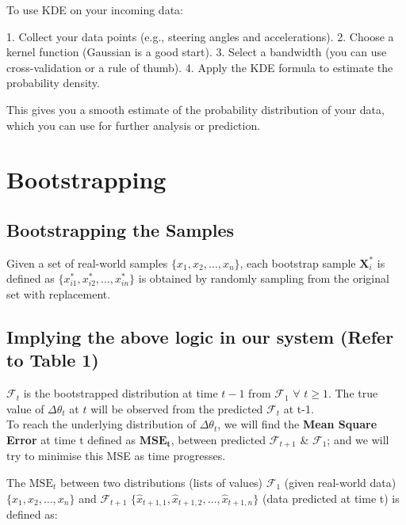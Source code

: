 \documentclass[conference]{IEEEtran}
\begin{document}
To use KDE on your incoming data:

1. Collect your data points (e.g., steering angles and accelerations).
2. Choose a kernel function (Gaussian is a good start).
3. Select a bandwidth (you can use cross-validation or a rule of thumb).
4. Apply the KDE formula to estimate the probability density.

This gives you a smooth estimate of the probability distribution of your data, which you can use for further analysis or prediction.

\section{Bootstrapping}
\subsection{Bootstrapping the Samples}

Given a set of real-world samples \( \{x_1, x_2, \ldots, x_n\} \), each bootstrap sample \(\mathbf{X}_i^*\) is defined as \( \{x_{i1}^*, x_{i2}^*, \ldots, x_{in}^*\} \) is obtained by randomly sampling from the original set with replacement. 


\subsection{Implying the above logic in our system (Refer to Table 1)}

$\mathcal{F}_{t}$ is the bootstrapped distribution at time $t-1$ from $\mathcal{F}_{1}$ $\forall$ $t \geq 1$. The true value of $\Delta \theta_t$ at $t$ will be observed from the predicted $\mathcal{F}_{t}$ at t-1. \\
To reach the underlying distribution of $\Delta \theta_t$, we will find the \textbf{Mean Square Error} at time t defined as $\textbf{MSE}_\textbf{t}$, between predicted $\mathcal{F}_{t+1}$ \& $\mathcal{F}_{1}$; and we will try to minimise this MSE as time progresses.

The $\text{MSE}_{t}$ between two distributions (lists of values) $\mathcal{F}_{1}$ (given real-world data) \( \{x_1, x_2, \ldots, x_n\} \) and $\mathcal{F}_{t+1}$ \( \{\hat{x}_{t+1,1}, \hat{x}_{t+1,2}, \ldots, \hat{x}_{t+1,n}\} \) (data predicted at time t) is defined as:
\end{document}
